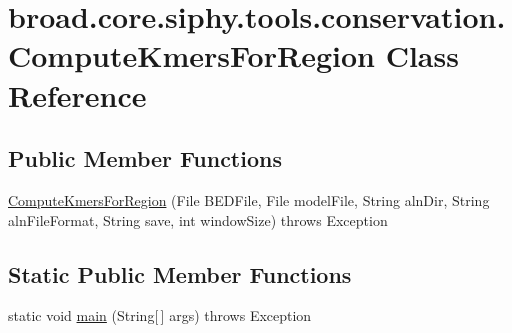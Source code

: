 \hypertarget{classbroad_1_1core_1_1siphy_1_1tools_1_1conservation_1_1_compute_kmers_for_region}{\section{broad.\+core.\+siphy.\+tools.\+conservation.\+Compute\+Kmers\+For\+Region Class Reference}
\label{classbroad_1_1core_1_1siphy_1_1tools_1_1conservation_1_1_compute_kmers_for_region}
}
\subsection*{Public Member Functions}
\begin{DoxyCompactItemize}
\item 
\hyperlink{classbroad_1_1core_1_1siphy_1_1tools_1_1conservation_1_1_compute_kmers_for_region_a22724955ca2aa57424d9707b3693b3b7}{Compute\+Kmers\+For\+Region} (File B\+E\+D\+File, File model\+File, String aln\+Dir, String aln\+File\+Format, String save, int window\+Size)  throws Exception
\end{DoxyCompactItemize}
\subsection*{Static Public Member Functions}
\begin{DoxyCompactItemize}
\item 
static void \hyperlink{classbroad_1_1core_1_1siphy_1_1tools_1_1conservation_1_1_compute_kmers_for_region_adf612a094f26b61397f7750cd5645a44}{main} (String\mbox{[}$\,$\mbox{]} args)  throws Exception
\end{DoxyCompactItemize}


